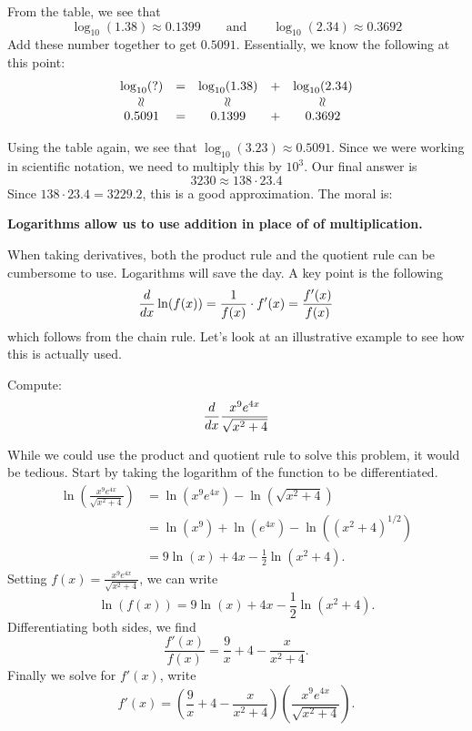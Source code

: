From the table, we see that 
\[
\log_{10}(1.38) \approx 0.1399\qquad\text{and}\qquad \log_{10}(2.34)\approx 0.3692
\]
Add these number together to get $0.5091$. Essentially, we know the
following at this point:
\[
\begin{array}{ccccc}
\log_{10}(\text{?}) & = & \log_{10}(1.38) & + & \log_{10}(2.34)\\
  \rotatebox[origin=c]{90}{$\approx$}  & & \rotatebox[origin=c]{90}{$\approx$}   & & \rotatebox[origin=c]{90}{$\approx$}  \\
0.5091 & = & 0.1399 & + & 0.3692
\end{array}
\]



Using the table again, we see that $\log_{10}(3.23)\approx
0.5091$. Since we were working in scientific notation, we need to
multiply this by $10^3$. Our final answer is
\[
3230 \approx 138\cdot 23.4
\]
Since $138\cdot 23.4 = 3229.2$, this is a good approximation. The moral is:
\begin{center}
\textbf{Logarithms allow us to use addition in place of of multiplication.}
\end{center}

When taking derivatives, both the product rule and the quotient rule
can be cumbersome to use. Logarithms will save the day. A key point is the following
\[
\frac{d}{dx} \ln(f(x)) = \frac{1}{f(x)}\cdot f'(x) = \frac{f'(x)}{f(x)}
\]
which follows from the chain rule. Let's look at an illustrative
example to see how this is actually used.

\begin{example} 
Compute:
\[
\frac{d}{dx} \frac{x^9e^{4x}}{\sqrt{x^2+4}}
\]
\end{example}
\begin{solution}
While we could use the product and quotient rule to solve this
problem, it would be tedious. Start by taking the logarithm of the
function to be differentiated.
\begin{align*}
\ln\left(\frac{x^9e^{4x}}{\sqrt{x^2+4}} \right) &= \ln\left(x^9e^{4x}\right) - \ln\left(\sqrt{x^2+4}\right)\\
&= \ln\left(x^9\right)+\ln\left(e^{4x}\right) - \ln\left((x^2+4)^{1/2}\right)\\
&= 9\ln(x)+4x - \frac{1}{2}\ln(x^2+4).
\end{align*}
Setting $f(x) = \frac{x^9e^{4x}}{\sqrt{x^2+4}}$, we can write
\[
\ln(f(x)) = 9\ln(x)+4x - \frac{1}{2}\ln(x^2+4).
\]
Differentiating both sides, we find
\[
\frac{f'(x)}{f(x)} = \frac{9}{x}+4 - \frac{x}{x^2+4}.
\]
Finally we solve for $f'(x)$, write
\[
f'(x) = \left(\frac{9}{x}+4 - \frac{x}{x^2+4}\right)\left(\frac{x^9e^{4x}}{\sqrt{x^2+4}}\right).
\]
\end{solution}

